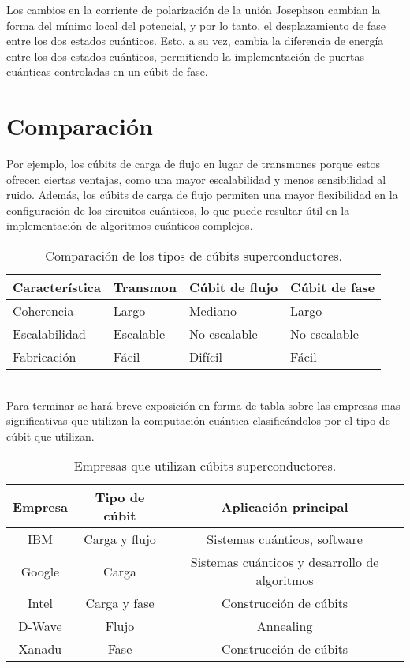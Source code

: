 \documentclass[12pt]{article}
\begin{document}
Los cambios en la corriente de polarización de la unión Josephson cambian la forma del mínimo local del potencial, y por lo tanto, el desplazamiento de fase entre los dos estados cuánticos. Esto, a su vez, cambia la diferencia de energía entre los dos estados cuánticos, permitiendo la implementación de puertas cuánticas controladas en un cúbit de fase.
\\
\section{Comparación} 
 Por ejemplo, los cúbits de carga de flujo en lugar de transmones porque estos ofrecen ciertas ventajas, como una mayor escalabilidad y menos sensibilidad al ruido. Además, los cúbits de carga de flujo permiten una mayor flexibilidad en la configuración de los circuitos cuánticos, lo que puede resultar útil en la implementación de algoritmos cuánticos complejos.\\
 \begin{table}[ht]
  \small
    \begin{center}
      \begin{tabularx}{\textwidth}{|X|X|X|X|}
      \hline
      \textbf{Característica} & \textbf{Transmon} & \textbf{Cúbit de flujo} & \textbf{Cúbit de fase} \\ \hline
      Coherencia & Largo & Mediano & Largo \\
      Escalabilidad & Escalable & No escalable & No escalable \\
      Fabricación & Fácil & Difícil & Fácil \\
      \hline
      \end{tabularx}
      \caption{Comparación de los tipos de cúbits superconductores.}
      \label{tab:comparacion-cubits-superconductores-transpuesta}
    \end{center}
\end{table}\\
 Para terminar se hará breve exposición en forma de tabla sobre las empresas mas significativas que utilizan la computación cuántica clasificándolos por el tipo de cúbit que utilizan.
 \begin{table}[ht]
  \begin{center}
    \begin{tabularx}{\textwidth}{|c|c|c|}
      \hline
      \textbf{Empresa} & \textbf{Tipo de cúbit} & \textbf{Aplicación principal} \\ \hline
       IBM & Carga y flujo & Sistemas cuánticos, software \\
      Google & Carga & Sistemas cuánticos y desarrollo de algoritmos \\
      Intel & Carga y fase & Construcción de cúbits \\
      D-Wave & Flujo & Annealing \\
      Xanadu & Fase & Construcción de cúbits \\ \hline
    \end{tabularx}
  \caption{Empresas que utilizan cúbits superconductores.}
  \label{tab:empresas-qubits-superconductores}
  \end{center}
\end{table}
\end{document}
